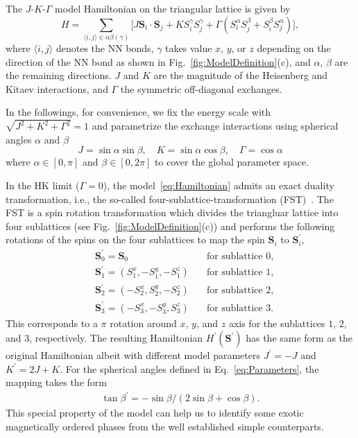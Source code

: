 \documentclass[aps,prb,reprint,amsfonts,amsmath,amssymb,showpacs,groupedaddress,superscriptaddress]{revtex4-1}
\begin{document}
The $J$-$K$-$\Gamma$ model Hamiltonian on the triangular lattice is given by
\begin{equation}
    H = \sum_{\langle i,j \rangle \in \alpha \beta (\gamma)} \lbrack J \bm{S}_i \cdot \bm{S}_j + K S_i^{\gamma} S_j^{\gamma} + \Gamma (S_i^{\alpha} S_j^{\beta} + S_i^{\beta} S_j^{\alpha}) \rbrack,
    \label{eq:Hamiltonian}
\end{equation}
where $\langle i,j \rangle$ denotes the NN bonds, $\gamma$ takes value $x$, $y$, or $z$ depending on the direction of the NN bond as shown in Fig.~\ref{fig:ModelDefinition}(c), and $\alpha$, $\beta$ are the remaining directions. $J$ and $K$ are the magnitude of the Heisenberg and Kitaev interactions, and $\Gamma$ the symmetric off-diagonal exchanges.

In the followings, for convenience, we fix the energy scale with $\sqrt{J^2 + K^2 + \Gamma^2}=1$ and parametrize the exchange interactions using spherical angles $\alpha$ and $\beta$
\begin{equation}
    J = \sin\alpha \sin\beta, \quad
    K = \sin\alpha \cos\beta, \quad
    \Gamma = \cos\alpha
    \label{eq:Parameters}
\end{equation}
where $\alpha \in [0, \pi]$ and $\beta \in [0, 2\pi]$ to cover the global parameter space.

In the HK limit ($\Gamma=0$), the model~\eqref{eq:Hamiltonian} admits an exact duality transformation, i.e., the so-called four-sublattice-transformation (FST)~\cite{PhysRevB.89.014414}. The FST is a spin rotation transformation which divides the triangluar lattice into four sublattices (see Fig.~\ref{fig:ModelDefinition}(c)) and performs the following rotations of the spins on the four sublattices to map the spin $\bm{S}_{i}$ to $\bm{S}_{i}^{\prime}$,
\begin{align*}
    & \bm{S}_{0}^{\prime} = \bm{S}_{0}& \quad \text{for sublattice 0}, \\
    & \bm{S}_{1}^{\prime} = (S_1^x, -S_1^y, -S_1^z)& \quad \text{for sublattice 1}, \\
    & \bm{S}_{2}^{\prime} = (-S_2^x, S_2^y, -S_2^z)& \quad \text{for sublattice 2}, \\
    & \bm{S}_{3}^{\prime} = (-S_3^x, -S_3^y, S_3^z)& \quad \text{for sublattice 3}.
\end{align*}
This corresponds to a $\pi$ rotation around $x$, $y$, and $z$ axis for the sublattices $1$, $2$, and $3$, respectively. The resulting Hamiltonian $H^{\prime}(\bm{S}^{\prime})$ has the same form as the original Hamiltonian albeit with different model parameters $J^{\prime} = -J$ and $K^{\prime} = 2J + K$. For the spherical angles defined in Eq.~\eqref{eq:Parameters}, the mapping takes the form
\begin{align}
    \tan\beta^{\prime} = -\sin\beta / (2\sin\beta + \cos\beta).
    \label{eq:FST}
\end{align}
This special property of the model can help us to identify some exotic magnetically ordered phases from the well established simple counterparts.
\end{document}
